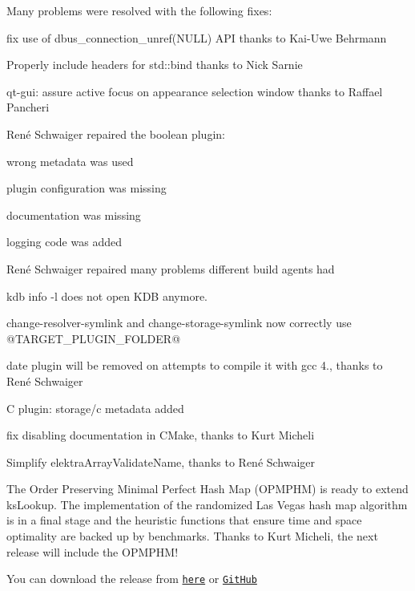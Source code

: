Many problems were resolved with the following fixes\+:


\begin{DoxyItemize}
\item fix use of {\ttfamily dbus\+\_\+connection\+\_\+unref(\+N\+U\+L\+L)} A\+PI thanks to Kai-\/\+Uwe Behrmann
\item Properly include headers for {\ttfamily std\+::bind} thanks to Nick Sarnie
\item qt-\/gui\+: assure active focus on appearance selection window thanks to Raffael Pancheri
\item René Schwaiger repaired the {\ttfamily boolean} plugin\+:
\begin{DoxyItemize}
\item wrong metadata was used
\item plugin configuration was missing
\item documentation was missing
\item logging code was added
\end{DoxyItemize}
\item René Schwaiger repaired many problems different build agents had
\item {\ttfamily kdb info -\/l} does not open {\ttfamily K\+DB} anymore.
\item {\ttfamily change-\/resolver-\/symlink} and {\ttfamily change-\/storage-\/symlink} now correctly use {\ttfamily @T\+A\+R\+G\+E\+T\+\_\+\+P\+L\+U\+G\+I\+N\+\_\+\+F\+O\+L\+D\+ER@}
\item date plugin will be removed on attempts to compile it with gcc 4., thanks to René Schwaiger
\item C plugin\+: storage/c metadata added
\item fix disabling documentation in C\+Make, thanks to Kurt Micheli
\item Simplify {\ttfamily elektra\+Array\+Validate\+Name}, thanks to René Schwaiger
\end{DoxyItemize}

The Order Preserving Minimal Perfect Hash Map (O\+P\+M\+P\+HM) is ready to extend {\ttfamily ks\+Lookup}. The implementation of the randomized Las Vegas hash map algorithm is in a final stage and the heuristic functions that ensure time and space optimality are backed up by benchmarks. Thanks to Kurt Micheli, the next release will include the O\+P\+M\+P\+H\+M!

You can download the release from \href{https://www.libelektra.org/ftp/elektra/releases/elektra-0.8.21.tar.gz}{\tt here} or \href{https://github.com/ElektraInitiative/ftp/blob/master/releases/elektra-0.8.21.tar.gz?raw=true}{\tt Git\+Hub}

